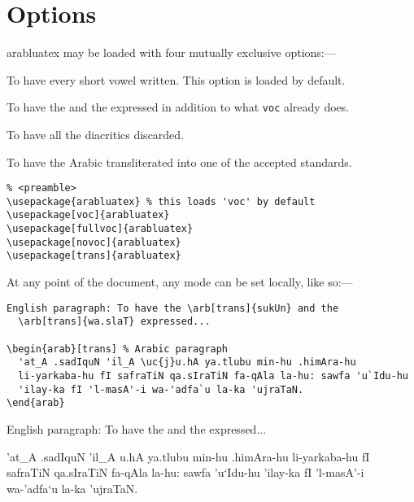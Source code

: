 \documentclass[paper=letter, DIV=classic, headings=small]{scrartcl}
\begin{document}
\section{Options}
\label{sec:options}
\textsf{arabluatex} may be loaded with four mutually exclusive options:---
\begin{compactdesc}
\item[voc] To have every short vowel written. This option is loaded by
  default.
\item[fullvoc] To have the  and the
   expressed in addition to what \verb|voc|
  already does.
\item[novoc] To have all the diacritics discarded.
\item[trans] To have the Arabic transliterated into one of the
  accepted standards.
\end{compactdesc}
\begin{verbatim}
% <preamble>
\usepackage{arabluatex} % this loads 'voc' by default
\usepackage[voc]{arabluatex}
\usepackage[fullvoc]{arabluatex}
\usepackage[novoc]{arabluatex}
\usepackage[trans]{arabluatex}
\end{verbatim}

At any point of the document, any mode can be set locally, like so:---
\begin{verbatim}
English paragraph: To have the \arb[trans]{sukUn} and the
  \arb[trans]{wa.slaT} expressed...

\begin{arab}[trans] % Arabic paragraph
  'at_A .sadIquN 'il_A \uc{j}u.hA ya.tlubu min-hu .himAra-hu
  li-yarkaba-hu fI safraTiN qa.sIraTiN fa-qAla la-hu: sawfa 'u`Idu-hu
  'ilay-ka fI 'l-masA'-i wa-'adfa`u la-ka 'ujraTaN.
\end{arab}
\end{verbatim}

English paragraph: To have the  and the
   expressed...

\begin{arab}[trans] %
  'at_A .sadIquN 'il_A u.hA ya.tlubu min-hu .himAra-hu
  li-yarkaba-hu fI safraTiN qa.sIraTiN fa-qAla la-hu: sawfa 'u`Idu-hu
  'ilay-ka fI 'l-masA'-i wa-'adfa`u la-ka 'ujraTaN.
\end{arab}
\end{document}

